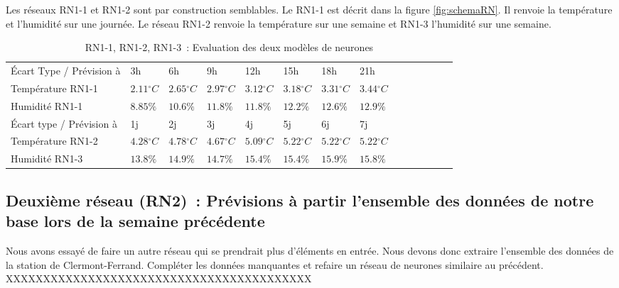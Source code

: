 \documentclass[11pt,a4paper]{article}
\begin{document}
Les réseaux RN1-1 et RN1-2 sont par construction semblables. Le RN1-1 est décrit dans la figure \ref{fig:schemaRN}. Il renvoie la température et l'humidité sur une journée. Le réseau RN1-2 renvoie la température sur une semaine et RN1-3 l'humidité sur une semaine. 
\begin{table}[h]
\begin{centering}
\begin{tabular}{llllllllllllll} 
\hline
\hline
Écart Type / Prévision à            &3h                         &6h                        &9h                           &12h                         &15h                          &18h          &         21h      \\
Température RN1-1& $2.11{}^{\circ}C$& $2.65{}^{\circ}C$& $2.97{}^{\circ}C$& $3.12{}^{\circ}C$& $3.18{}^{\circ}C$& $3.31{}^{\circ}C$&$3.44{}^{\circ}C$ \\
Humidité RN1-1&$8.85\%$ & $10.6\%$ & $11.8\%$ & $11.8\%$ & $12.2\%$ & $12.6\%$ & $12.9\%$  \\
\hline
Écart type / Prévision à                  & 1j &           2j            &3j            &4j          &5j            & 6j & 7j \\
Température RN1-2 & $4.28{}^{\circ}C$ & $4.78{}^{\circ}C$ & $4.67{}^{\circ}C$ & $5.09{}^{\circ}C$ & $5.22{}^{\circ}C$ & $5.22{}^{\circ}C$  & $5.22{}^{\circ}C$ \\
Humidité RN1-3     & $13.8\%$ &  $ 14.9\% $    &  $ 14.7\% $         &  $ 15.4\% $        &  $ 15.4\% $         &  $ 15.9\% $  &  $ 15.8\% $  \\
\hline 
\end{tabular}
\caption{RN1-1, RN1-2, RN1-3~: Evaluation des deux modèles de neurones}\label{tab:evalRN}
\end{centering}
\end{table}

\subsection {Deuxième réseau (RN2)~: Prévisions à partir l'ensemble des données de notre base lors de la semaine précédente}
Nous avons essayé de faire un autre réseau qui se prendrait plus d'éléments en entrée.
Nous devons donc extraire l'ensemble des données de la station de Clermont-Ferrand. Compléter les données manquantes et refaire un réseau de neurones similaire au précédent.\\
XXXXXXXXXXXXXXXXXXXXXXXXXXXXXXXXXXXXXXXXX
\end{document}
